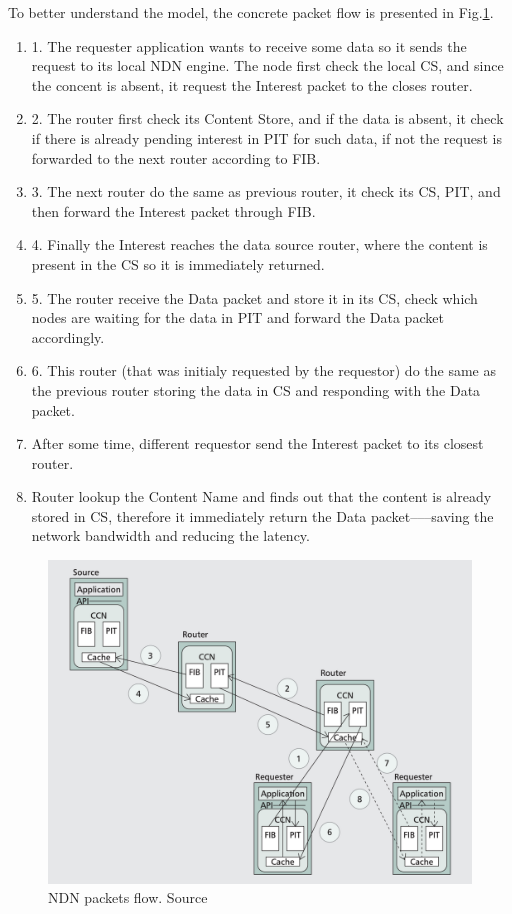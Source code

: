 To better understand the model, the concrete packet flow is presented in Fig.\ref{fig:ndn-flow}. 
\begin{enumerate}
    \item 1. The requester application wants to receive some data so it sends the request to its local NDN engine. The node first check the local CS, and since the concent is absent, it request the Interest packet to the closes router.
    \item 2. The router first check its Content Store, and if the data is absent, it check if there is already pending interest in PIT for such data, if not the request is forwarded to the next router according to FIB.  
    \item 3. The next router do the same as previous router, it check its CS, PIT, and then forward the Interest packet through FIB.
    \item 4. Finally the Interest reaches the data source router, where the content is present in the CS so it is immediately returned.
    \item 5. The router receive the Data packet and store it in its CS, check which nodes are waiting for the data in PIT and forward the Data packet accordingly.
    \item 6. This router (that was initialy requested by the requestor) do the same as the previous router storing the data in CS and responding with the Data packet.
    \item After some time, different requestor send the Interest packet to its closest router.
    \item Router lookup the Content Name and finds out that the content is already stored in CS, therefore it immediately return the Data packet–––saving the network bandwidth and reducing the latency.
\end{enumerate}

\begin{figure}[h]
    \centering
    \includegraphics[width=\linewidth]{img/ndn-flow.png}
    \caption{NDN packets flow. Source \cite{ahlgren2012survey}}
    \label{fig:ndn-flow}
\end{figure}

